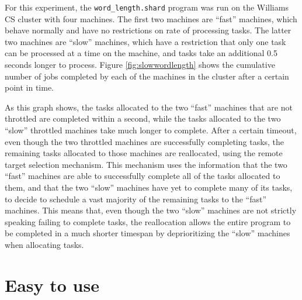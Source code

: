 \documentclass[oneside]{report}
\begin{document}
For this experiment, the \texttt{word\_length.shard} program was run on the Williams CS cluster with four machines.
The first two machines are ``fast'' machines, which behave normally and have no restrictions on rate of processing tasks.
The latter two machines are ``slow'' machines, which have a restriction that only one task can be processed at a time on the machine, and tasks take an additional 0.5 seconds longer to process.
Figure \ref{fig:slowwordlength} shows the cumulative number of jobs completed by each of the machines in the cluster after a certain point in time.

As this graph shows, the tasks allocated to the two ``fast'' machines that are not throttled are completed within a second, while the tasks allocated to the two ``slow'' throttled machines take much longer to complete.
After a certain timeout, even though the two throttled machines are successfully completing tasks, the remaining tasks allocated to those machines are reallocated, using the remote target selection mechanism.
This mechanism uses the information that the two ``fast'' machines are able to successfully complete all of the tasks allocated to them, and that the two ``slow'' machines have yet to complete many of its tasks, to decide to schedule a vast majority of the remaining tasks to the ``fast'' machines.
This means that, even though the two ``slow'' machines are not strictly speaking failing to complete tasks, the reallocation allows the entire program to be completed in a much shorter timespan by deprioritizing the ``slow'' machines when allocating tasks.

\section{Easy to use}

\end{document}
